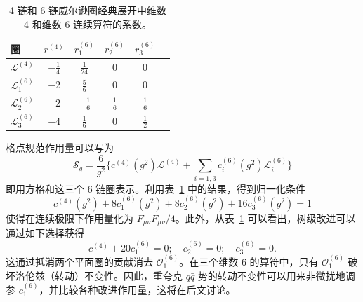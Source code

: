 \begin{table}[htbp]
\centering
\begin{tabular}{lccccc}
\toprule
圈 & $r^{(4)}$ & $r_1^{(6)}$ & $r_2^{(6)}$ & $r_3^{(6)}$\\
\midrule
$\mathcal{L}^{(4)}$  & $-\frac{1}{4}$ & $\frac{1}{24}$ & 0 & 0\\
$\mathcal{L}_1^{(6)}$ & $-2$ & $\frac{5}{6}$ & 0 & 0\\
$\mathcal{L}_2^{(6)}$ & $-2$ & $-\frac{1}{6}$ & $\frac{1}{6}$ & $\frac{1}{6}$\\
$\mathcal{L}_3^{(6)}$ & $-4$ & $\frac{1}{6}$ & 0 & $\frac{1}{2}$\\
\bottomrule
\end{tabular}
\caption{4 链和 6 链威尔逊圈经典展开中维数 4 和维数 6 连续算符的系数。}
\label{tab:4}
\end{table}

格点规范作用量可以写为
\begin{equation}
\mathcal{S}_g = \frac{6}{g^2}\bigg\{c^{(4)}(g^2)\mathcal{L}^{(4)}
    + \sum_{i=1,3} c_i^{(6)}(g^2)\mathcal{L}_i^{(6)}\bigg\}
\label{eq:gaugeimpb}
\end{equation}
即用方格和这三个 6 链圈表示。利用表~\ref{tab:4} 中的结果，得到归一化条件
\begin{equation}
c^{(4)}(g^2) + 8c_1^{(6)}(g^2) + 8c_2^{(6)}(g^2)
    + 16c_3^{(6)}(g^2) = 1
\label{eq:gaugeimpc}
\end{equation}
使得在连续极限下作用量化为
$F_{\mu\nu}F_{\mu\nu}/4$。此外，从表~\ref{tab:4} 可以看出，树级改进可以通过如下选择获得
\begin{equation}
c^{(4)} + 20c_1^{(6)} = 0;\quad c_2^{(6)} = 0;\quad c_3^{(6)} = 0.
\label{eq:gaugeclassicalimp}
\end{equation}
这通过抵消两个平面圈的贡献消去 $\mathcal{O}_1^{(6)}$。在三个维数 6 的算符中，只有 $\mathcal{O}_1^{(6)}$ 破坏洛伦兹（转动）不变性。因此，重夸克 $q\bar q$ 势的转动不变性可以用来非微扰地调参 $c_1^{(6)}$，并比较各种改进作用量，这将在后文讨论。

